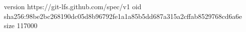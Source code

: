 version https://git-lfs.github.com/spec/v1
oid sha256:98be2bc268190dc05d8b96792fe1a1a85b5dd687a315a2cffab8529768cd6a6e
size 117000
